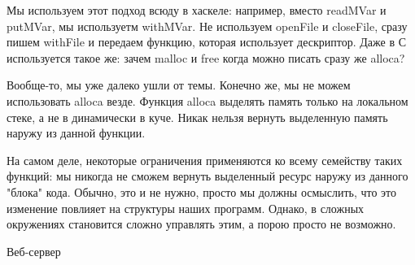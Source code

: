 Мы используем этот подход всюду в хаскеле: например, вместо readMVar и putMVar, мы используетм withMVar. Не используем openFile и closeFile, сразу пишем withFile и передаем функцию, которая использует дескриптор. Даже в С используется такое же: зачем malloc и free когда можно писать сразу же alloca?

Вообще-то, мы уже далеко ушли от темы. Конечно же, мы не можем использовать alloca везде. Функция alloca выделять память только на локальном стеке, а не в динамически в куче. Никак нельзя вернуть выделенную память наружу из данной функции.

На самом деле, некоторые ограничения применяются ко всему семейству таких функций: мы никогда не сможем вернуть выделенный ресурс наружу из данного "блока" кода. Обычно, это и не нужно, просто мы должны осмыслить, что это изменение повлияет на структуры наших программ. Однако, в сложных окружениях становится сложно управлять этим, а порою просто не возможно. 

Веб-сервер

